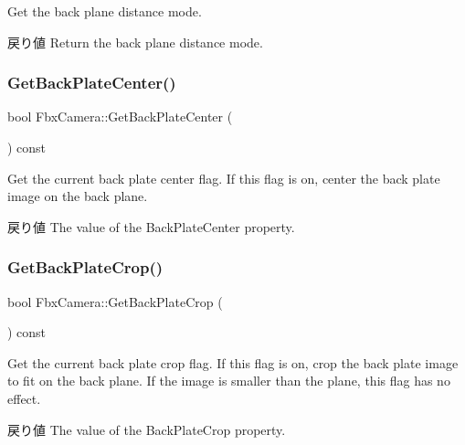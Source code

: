 Get the back plane distance mode. \begin{DoxyReturn}{戻り値}
Return the back plane distance mode. 
\end{DoxyReturn}
\mbox{\label{class_fbx_camera_a9313551dcd023e3b47e29b8a899f1f23}} 
\subsubsection{\texorpdfstring{Get\+Back\+Plate\+Center()}{GetBackPlateCenter()}}
{\footnotesize\ttfamily bool Fbx\+Camera\+::\+Get\+Back\+Plate\+Center (\begin{DoxyParamCaption}{ }\end{DoxyParamCaption}) const}

Get the current back plate center flag. If this flag is on, center the back plate image on the back plane. \begin{DoxyReturn}{戻り値}
The value of the Back\+Plate\+Center property. 
\end{DoxyReturn}
\mbox{\label{class_fbx_camera_a76021d40416efffd5bffcf462741bada}} 
\subsubsection{\texorpdfstring{Get\+Back\+Plate\+Crop()}{GetBackPlateCrop()}}
{\footnotesize\ttfamily bool Fbx\+Camera\+::\+Get\+Back\+Plate\+Crop (\begin{DoxyParamCaption}{ }\end{DoxyParamCaption}) const}

Get the current back plate crop flag. If this flag is on, crop the back plate image to fit on the back plane. If the image is smaller than the plane, this flag has no effect. \begin{DoxyReturn}{戻り値}
The value of the Back\+Plate\+Crop property. 
\end{DoxyReturn}
\mbox{\label{class_fbx_camera_a5174e9fbec62fa007eb86d3e5c7ef70f}} 
